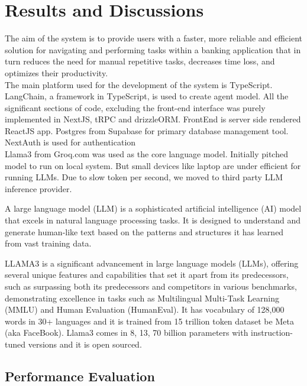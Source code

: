 \chapter{Results and Discussions}
\setcounter{equation}{0}

The aim of the system is to provide users with a faster, more reliable and efficient solution for navigating and performing tasks within a banking application that in turn reduces the need for manual repetitive tasks, decreases time loss, and optimizes their productivity.\\

\noindent The main platform used for the development of the system is TypeScript. LangChain, a framework in TypeScript, is used to create agent model. All the significant sections of code, excluding the front-end interface was purely implemented in NextJS, tRPC and drizzleORM. FrontEnd is server side rendered ReactJS app. Postgres from Supabase for primary database management tool. NextAuth is used for authentication\\

\noindent
Llama3 from Groq.com was used as the core language model. Initially pitched model to run on local system. But small devices like laptop are under efficient for running LLMs. Due to slow token per second, we moved to third party LLM inference provider.

\noindent A large language model (LLM) is a sophisticated artificial intelligence (AI) model that excels in natural language processing tasks. It is designed to understand and generate human-like text based on the patterns and structures it has learned from vast training data.

\noindent LLAMA3 is a significant advancement in large language models (LLMs), offering several unique features and capabilities that set it apart from its predecessors, such as surpassing both its predecessors and competitors in various benchmarks, demonstrating excellence in tasks such as Multilingual Multi-Task Learning (MMLU) and Human Evaluation (HumanEval). It has vocabulary of 128,000 words in 30+ languages and it is trained from 15 trillion token dataset be Meta (aka FaceBook). Llama3 comes in 8, 13, 70 billion parameters with instruction-tuned versions and it is open sourced.

\section{Performance Evaluation}

